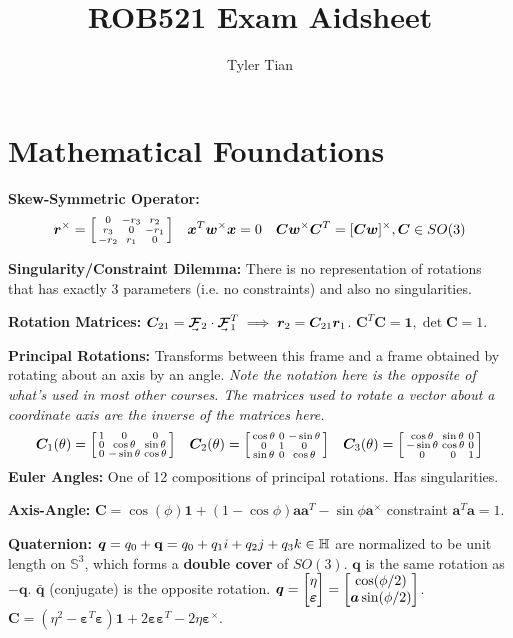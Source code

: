 \documentclass[twocolumn, 8pt]{extarticle}
\title{ROB521 Exam Aidsheet}
\author{Tyler Tian}
\begin{document}
\section{Mathematical Foundations} %

\textbf{Skew-Symmetric Operator:}
\begin{gather*}
\bm r^\times = \matthree[bsmall]{0}{-r_3}{r_2}{r_3}{0}{-r_1}{-r_2}{r_1}{0} \quad \bm x^T\bm w^\times\bm x = 0 \quad
\bm C\bm w^\times\bm C^T = [\bm C\bm w]^\times, \bm C \in SO(3)
\end{gather*}

\textbf{Singularity/Constraint Dilemma:} There is no representation of rotations that has exactly 3 parameters
(i.e. no constraints) and also no singularities.

\textbf{Rotation Matrices:} \(\bm C_{21} = \vcx F_2 \cdot \vcx F_1^T \implies \bm r_2 = \bm C_{21}\bm r_1\).
\(\bm C^T\bm C = \bm 1, \det\bm C = 1\).

\textbf{Principal Rotations:} Transforms between this frame and a frame obtained by rotating about an axis by an
angle. \emph{Note the notation here is the opposite of what's used in most other courses. The matrices used to rotate a
vector about a coordinate axis are the inverse of the matrices here.}
\[
\bm C_1(\theta) = \matthree[bsmall]{1}{0}{0}{0}{\cos\theta}{\sin\theta}{0}{-\sin\theta}{\cos\theta} \quad
\bm C_2(\theta) = \matthree[bsmall]{\cos\theta}{0}{-\sin\theta}{0}{1}{0}{\sin\theta}{0}{\cos\theta} \quad
\bm C_3(\theta) = \matthree[bsmall]{\cos\theta}{\sin\theta}{0}{-\sin\theta}{\cos\theta}{0}{0}{0}{1}
\]
\textbf{Euler Angles:} One of 12 compositions of principal rotations. Has singularities.

\textbf{Axis-Angle:} \(\bm C = \cos(\phi)\bm 1 + (1 - \cos\phi)\bm a\bm a^T - \sin\phi\bm a^\times\) constraint \(\bm a^T\bm a = 1\).

\textbf{Quaternion:} \(\bm q = q_0 + \bm{\mathrm{q}} = q_0 + q_1i + q_2j + q_3k \in \mathbb H\) are normalized to be unit length on \(\mathbb S^3\),
which forms a \textbf{double cover} of \(SO(3)\).
\(\bm q\) is the same rotation as \(-\bm q\). \(\bar{\bm q}\) (conjugate) is the opposite rotation.
\(\bm q = \cvec{\eta}{\bm\varepsilon} = \cvec{\cos(\phi/2)}{\bm a\sin(\phi/2)}\).
\(\bm C = (\eta^2 - \bm\varepsilon^T\bm\varepsilon)\bm 1 + 2\bm\varepsilon\bm\varepsilon^T - 2\eta\bm \varepsilon^\times\).
\end{document}

